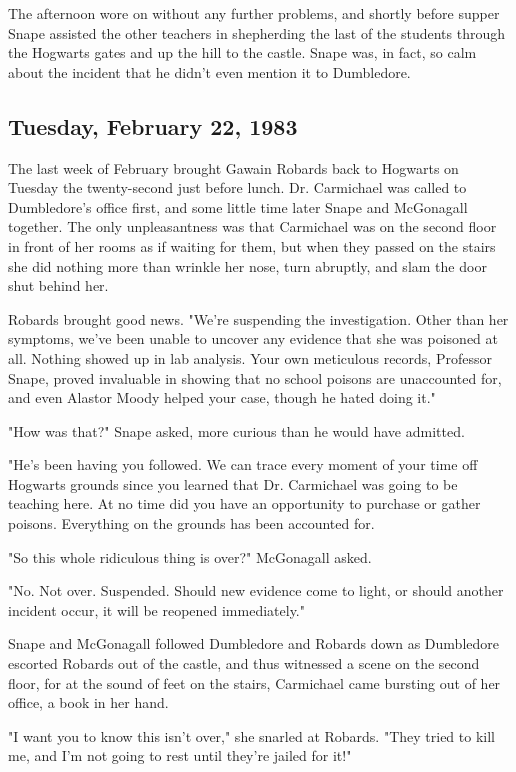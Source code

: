 The afternoon wore on without any further problems, and shortly before supper Snape assisted the other teachers in shepherding the last of the students through the Hogwarts gates and up the hill to the castle. Snape was, in fact, so calm about the incident that he didn't even mention it to Dumbledore.

\subsection{Tuesday, February 22, 1983}

The last week of February brought Gawain Robards back to Hogwarts on Tuesday the twenty-second just before lunch. Dr. Carmichael was called to Dumbledore's office first, and some little time later Snape and McGonagall together. The only unpleasantness was that Carmichael was on the second floor in front of her rooms as if waiting for them, but when they passed on the stairs she did nothing more than wrinkle her nose, turn abruptly, and slam the door shut behind her.

Robards brought good news. "We're suspending the investigation. Other than her symptoms, we've been unable to uncover any evidence that she was poisoned at all. Nothing showed up in lab analysis. Your own meticulous records, Professor Snape, proved invaluable in showing that no school poisons are unaccounted for, and even Alastor Moody helped your case, though he hated doing it."

"How was that?" Snape asked, more curious than he would have admitted.

"He's been having you followed. We can trace every moment of your time off Hogwarts grounds since you learned that Dr. Carmichael was going to be teaching here. At no time did you have an opportunity to purchase or gather poisons. Everything on the grounds has been accounted for.

"So this whole ridiculous thing is over?" McGonagall asked.

"No. Not over. Suspended. Should new evidence come to light, or should another incident occur, it will be reopened immediately."

Snape and McGonagall followed Dumbledore and Robards down as Dumbledore escorted Robards out of the castle, and thus witnessed a scene on the second floor, for at the sound of feet on the stairs, Carmichael came bursting out of her office, a book in her hand.

"I want you to know this isn't over," she snarled at Robards. "They tried to kill me, and I'm not going to rest until they're jailed for it!"

